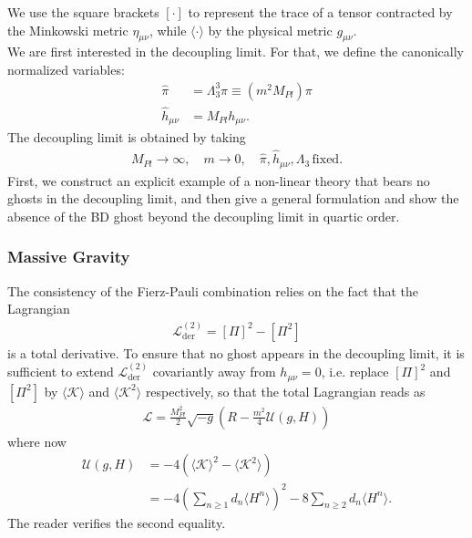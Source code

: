 \documentclass{book}
\theoremstyle{definition}
\newcommand{\lag}{\mathcal{L}}
\newcommand{\nn}{\nonumber}
\newcommand{\f}[2]{\frac{#1}{#2}}
\newcommand{\lp}{\left(}
\newcommand{\rp}{\right)}
\begin{document}
We use the square brackets $[\cdot]$ to represent the trace of a tensor contracted by the Minkowski metric $\eta_{\mu\nu}$, while $\langle \cdot \rangle$ by the physical metric $g_{\mu\nu}$. \\

We are first interested in the decoupling limit. For that, we define the canonically normalized variables:
\begin{align}
\hat\pi &= \Lambda_3^3 \pi \equiv (m^2 M_{Pl}) \pi\\
\hat{h}_{\mu\nu} &= M_{Pl}h_{\mu\nu}.
\end{align}
The decoupling limit is obtained by taking
\begin{align}
M_{Pl} \to \infty, \quad m\to 0, \quad \hat\pi, \hat h_{\mu\nu}, \Lambda_3\, \text{fixed}.
\end{align}
First, we
construct an explicit example of a non-linear theory that
bears no ghosts in the decoupling limit, and then give
a general formulation and show the absence of the BD
ghost beyond the decoupling limit in quartic order.



















\newpage 

\subsubsection{Massive Gravity}
The consistency of the Fierz-Pauli
combination relies on the fact that the Lagrangian
\begin{align}
\lag^{(2)}_\text{der} = [\Pi]^2 - [\Pi^2]
\end{align}
is a total derivative. To ensure that no ghost appears
in the decoupling limit, it is sufficient to extend $\lag^{(2)}_\text{der}$ covariantly away from $h_{\mu\nu} = 0$, i.e. replace $[\Pi]^2$ and $[\Pi^2]$ by $\langle \mathcal{K}\rangle$ and $\langle \mathcal{K}^2 \rangle$ respectively, so that the total Lagrangian reads as
\begin{align}
\lag = \f{M^2_{Pl}}{2}\sqrt{-g}\lp R - \f{m^2}{4}\mathcal{U}(g,H) \rp
\end{align}
where now 
\begin{align}
\mathcal{U}(g,H) &= -4\lp \langle \mathcal{K} \rangle^2 - \langle \mathcal{K}^2\rangle \rp\nn\\
&=-4\lp \sum_{n \geq 1} d_n \langle H^n \rangle \rp^2 - 8\sum_{n\geq 2}d_n \langle H^n \rangle.
\end{align}
The reader verifies the second equality. \\
\end{document}
